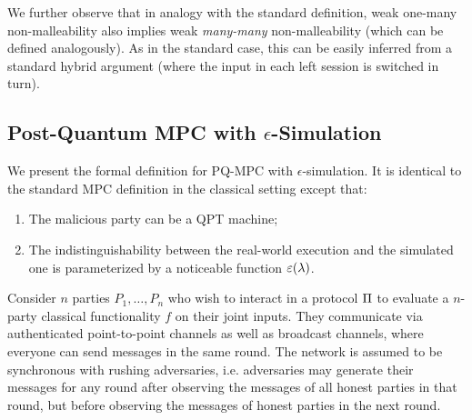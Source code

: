 \begin{remark}
    We further observe that in analogy with the standard definition, weak one-many non-malleability also implies weak {\em many-many} non-malleability (which can be defined analogously). As in the standard case, this can be easily inferred from a standard hybrid argument (where the input in each left session is switched in turn). 
\end{remark}











\subsection{Post-Quantum MPC with $\epsilon$-Simulation}
We present the formal definition for PQ-MPC with $\epsilon$-simulation. It is identical to the standard MPC definition in the classical setting except that:
\begin{enumerate}
\item
The malicious party can be a QPT machine;
\item
The indistinguishability between the real-world execution and the simulated one is parameterized by a noticeable function $\varepsilon(\lambda)$. 
\end{enumerate}
Consider $n$ parties $P_1, \ldots, P_n$ who wish to interact in a protocol $\mathrm{\Pi}$ to evaluate a $n$-party classical functionality $f$ on their joint inputs. They communicate via authenticated point-to-point channels as well as broadcast channels, where everyone can send messages in the same round. The network is assumed to be synchronous with rushing adversaries, i.e. adversaries may generate their messages for any round after observing the messages of all honest parties in that round, but before observing the messages of honest parties in the next round. 

